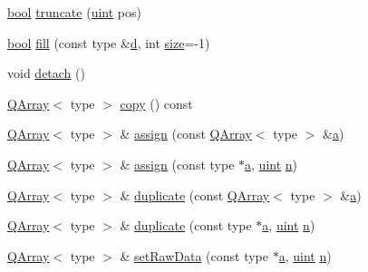 \begin{DoxyCompactItemize}
\item 
\hyperlink{qglobal_8h_a1062901a7428fdd9c7f180f5e01ea056}{bool} \hyperlink{class_q_array_ab628b764c186ec5ae01cdc47d909adbb}{truncate} (\hyperlink{qglobal_8h_a4d3943ddea65db7163a58e6c7e8df95a}{uint} pos)
\item 
\hyperlink{qglobal_8h_a1062901a7428fdd9c7f180f5e01ea056}{bool} \hyperlink{class_q_array_ac659207d09bbd90d9a31c91ff425490e}{fill} (const type \&\hyperlink{060__command__switch_8tcl_af43f4b1f0064a33b2d662af9f06d3a00}{d}, int \hyperlink{class_q_array_a5f9185766dff05b3a1fd43a0722e8fd4}{size}=-\/1)
\item 
void \hyperlink{class_q_array_aed81a36728344a4d944ca2639d21a162}{detach} ()
\item 
\hyperlink{class_q_array}{Q\+Array}$<$ type $>$ \hyperlink{class_q_array_ae0a1685d7df8386820252ca17f4c3b34}{copy} () const 
\item 
\hyperlink{class_q_array}{Q\+Array}$<$ type $>$ \& \hyperlink{class_q_array_a4bfb1e75aa87a691f9bcbdb894022f95}{assign} (const \hyperlink{class_q_array}{Q\+Array}$<$ type $>$ \&\hyperlink{060__command__switch_8tcl_ab08ae027fc5777bc4f0629f1b60b35db}{a})
\item 
\hyperlink{class_q_array}{Q\+Array}$<$ type $>$ \& \hyperlink{class_q_array_a3f38816b5bb61a5846a563900b4f3611}{assign} (const type $\ast$\hyperlink{060__command__switch_8tcl_ab08ae027fc5777bc4f0629f1b60b35db}{a}, \hyperlink{qglobal_8h_a4d3943ddea65db7163a58e6c7e8df95a}{uint} \hyperlink{060__command__switch_8tcl_acdde3cd86eb2421ce8dbb2e85227d368}{n})
\item 
\hyperlink{class_q_array}{Q\+Array}$<$ type $>$ \& \hyperlink{class_q_array_a17cb2acfeb58ffb962f5048ee79bcd07}{duplicate} (const \hyperlink{class_q_array}{Q\+Array}$<$ type $>$ \&\hyperlink{060__command__switch_8tcl_ab08ae027fc5777bc4f0629f1b60b35db}{a})
\item 
\hyperlink{class_q_array}{Q\+Array}$<$ type $>$ \& \hyperlink{class_q_array_a65234c6c937135bb67f96fb2c6ff6553}{duplicate} (const type $\ast$\hyperlink{060__command__switch_8tcl_ab08ae027fc5777bc4f0629f1b60b35db}{a}, \hyperlink{qglobal_8h_a4d3943ddea65db7163a58e6c7e8df95a}{uint} \hyperlink{060__command__switch_8tcl_acdde3cd86eb2421ce8dbb2e85227d368}{n})
\item 
\hyperlink{class_q_array}{Q\+Array}$<$ type $>$ \& \hyperlink{class_q_array_a5d29d910696e670349a33854710f4d1f}{set\+Raw\+Data} (const type $\ast$\hyperlink{060__command__switch_8tcl_ab08ae027fc5777bc4f0629f1b60b35db}{a}, \hyperlink{qglobal_8h_a4d3943ddea65db7163a58e6c7e8df95a}{uint} \hyperlink{060__command__switch_8tcl_acdde3cd86eb2421ce8dbb2e85227d368}{n})

\end{DoxyCompactItemize}

